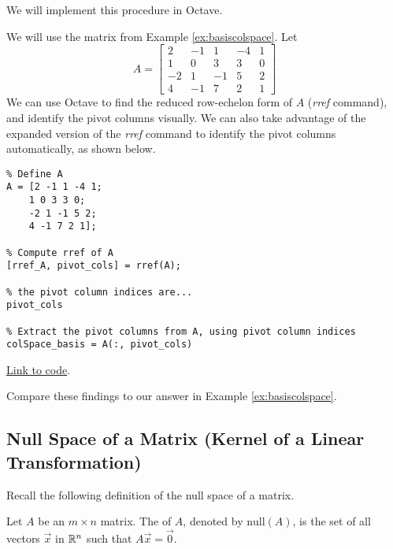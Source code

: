 \documentclass{ximera}
\begin{document}
We will implement this procedure in Octave.

\begin{template}\label{temp:colSpace}
We will use the matrix from Example \ref{ex:basiscolspace}.  Let $$A=\begin{bmatrix}2&-1&1&-4&1\\1&0&3&3&0\\-2&1&-1&5&2\\4&-1&7&2&1\end{bmatrix}$$
We can use Octave to find the reduced row-echelon form of $A$ (\emph{rref} command), and identify the pivot columns visually.  We can also take advantage of the expanded version of the \emph{rref} command to identify the pivot columns automatically, as shown below.

\begin{verbatim}
% Define A
A = [2 -1 1 -4 1;
    1 0 3 3 0;
    -2 1 -1 5 2;
    4 -1 7 2 1];

% Compute rref of A
[rref_A, pivot_cols] = rref(A);

% the pivot column indices are...
pivot_cols

% Extract the pivot columns from A, using pivot column indices
colSpace_basis = A(:, pivot_cols)
\end{verbatim}

\href{https://sagecell.sagemath.org/?z=eJxtTkEKwjAQvAfyh7kULNhiqiIoHoL6Ao9SSq2JBmxTklR8vhssKOjuZWeGmdkEe6VNpyA5k9jiVCATEMgWEBvOQCMww5x2NuKsiLrAEsXILCJcgfiSGM4S7GzbD0HBOaVhdUw_xbuSU_TmYUPV2LsvqTCyE5mOvnBTbx2kD20H011Mozxqp_I85-xjfhsOz-DqJvwYPbSzLahu8Ka7_g3ljPCxrxtVnWtvPH0jJ-vvB9MX3FlRVA==&lang=octave&interacts=eJyLjgUAARUAuQ==}{Link to code}.

Compare these findings to our answer in Example \ref{ex:basiscolspace}.
\end{template}  

\subsection*{Null Space of a Matrix (Kernel of a Linear Transformation)}

Recall the following definition of the null space of a matrix.
\begin{definition}[\ref{def:nullspace}] Let $A$ be an $m\times n$ matrix.  The  of $A$, denoted by $\mbox{null}(A)$, is the set of all vectors $\vec{x}$ in $\mathbb{R}^n$ such that $A\vec{x}=\vec{0}$.
\end{definition}
\end{document}
